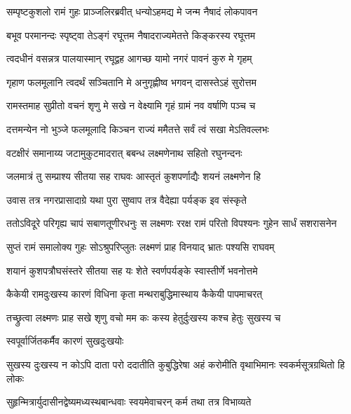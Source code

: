 \twolineshloka
{सम्पृष्टकुशलो रामं गुहः प्राञ्जलिरब्रवीत्}
{धन्योऽहमद्य मे जन्म नैषादं लोकपावन} %

\twolineshloka
{बभूव परमानन्दः स्पृष्ट्वा तेऽङ्गं रघूत्तम}
{नैषादराज्यमेतत्ते किङ्करस्य रघूत्तम} %

\twolineshloka
{त्वदधीनं वसन्नत्र पालयास्मान् रघूद्वह}
{आगच्छ यामो नगरं पावनं कुरु मे गृहम्} %

\twolineshloka
{गृहाण फलमूलानि त्वदर्थं सञ्चितानि मे}
{अनुगृह्णीष्व भगवन् दासस्तेऽहं सुरोत्तम} %

\twolineshloka
{रामस्तमाह सुप्रीतो वचनं शृणु मे सखे}
{न वेक्ष्यामि गृहं ग्रामं नव वर्षाणि पञ्च च} %

\twolineshloka
{दत्तमन्येन नो भुञ्जे फलमूलादि किञ्चन}
{राज्यं ममैतत्ते सर्वं त्वं सखा मेऽतिवल्लभः} %

\twolineshloka
{वटक्षीरं समानाय्य जटामुकुटमादरात्}
{बबन्ध लक्ष्मणेनाथ सहितो रघुनन्दनः} %

\twolineshloka
{जलमात्रं तु सम्प्राश्य सीतया सह राघवः}
{आस्तृतं कुशपर्णाद्यैः शयनं लक्ष्मणेन हि} %

\twolineshloka
{उवास तत्र नगरप्रासादाग्रे यथा पुरा}
{सुष्वाप तत्र वैदेह्या पर्यङ्क इव संस्कृते} %

\fourlineindentedshloka
{ततोऽविदूरे परिगृह्य चापं}
{सबाणतूणीरधनुः स लक्ष्मणः}
{ररक्ष रामं परितो विपश्यनः}
{गुहेन सार्धं सशरासनेन} %





\twolineshloka
{सुप्तं रामं समालोक्य गुहः सोऽश्रुपरिप्लुतः}
{लक्ष्मणं प्राह विनयाद् भ्रातः पश्यसि राघवम्} %

\twolineshloka
{शयानं कुशपत्रौघसंस्तरे सीतया सह}
{यः शेते स्वर्णपर्यङ्के स्वास्तीर्णे भवनोत्तमे} %

\twolineshloka
{कैकेयी रामदुःखस्य कारणं विधिना कृता}
{मन्थराबुद्धिमास्थाय कैकेयी पापमाचरत्} %

\twolineshloka
{तच्छ्रुत्वा लक्ष्मणः प्राह सखे शृणु वचो मम}
{कः कस्य हेतुर्दुःखस्य कश्च हेतुः सुखस्य च} %

\onelineshloka
{स्वपूर्वार्जितकर्मैव कारणं सुखदुःखयोः} %

\fourlineindentedshloka
{सुखस्य दुःखस्य न कोऽपि दाता}
{परो ददातीति कुबुद्धिरेषा}
{अहं करोमीति वृथाभिमानः}
{स्वकर्मसूत्रग्रथितो हि लोकः} %

\twolineshloka
{सुहृन्मित्रार्युदासीनद्वेष्यमध्यस्थबान्धवाः}
{स्वयमेवाचरन् कर्म तथा तत्र विभाव्यते} %

